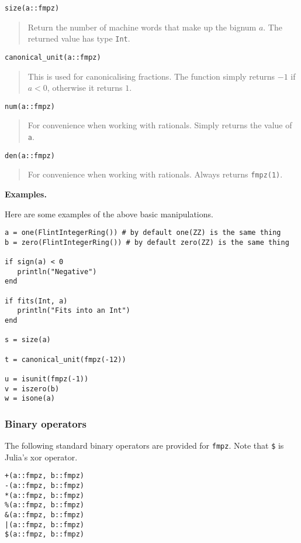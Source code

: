 \documentclass[a4paper,10pt]{article}
\newcommand{\code}{\lstinline}
\newcommand{\desc}[1]{\vspace{-3mm}\begin{quote}#1\end{quote}}
\begin{document}
\begin{lstlisting}
size(a::fmpz)
\end{lstlisting}

\desc{Return the number of machine words that make up the bignum $a$. The
returned value has type \code{Int}.}

\begin{lstlisting}
canonical_unit(a::fmpz)
\end{lstlisting}

\desc{This is used for canonicalising fractions. The function simply returns $-1$
if $a < 0$, otherwise it returns $1$.}

\begin{lstlisting}
num(a::fmpz)
\end{lstlisting}

\desc{For convenience when working with rationals. Simply returns the value of \code{a}.}

\begin{lstlisting}
den(a::fmpz)
\end{lstlisting}

\desc{For convenience when working with rationals. Always returns \code{fmpz(1)}.}

\textbf{Examples.}

Here are some examples of the above basic manipulations.

\begin{lstlisting}
a = one(FlintIntegerRing()) # by default one(ZZ) is the same thing 
b = zero(FlintIntegerRing()) # by default zero(ZZ) is the same thing 

if sign(a) < 0
   println("Negative")
end

if fits(Int, a)
   println("Fits into an Int")
end

s = size(a)

t = canonical_unit(fmpz(-12))

u = isunit(fmpz(-1))
v = iszero(b)
w = isone(a)
\end{lstlisting}

\subsubsection{Binary operators}

The following standard binary operators are provided for \code{fmpz}. Note that \code{$} is Julia's
xor operator.

\begin{lstlisting}
+(a::fmpz, b::fmpz)
-(a::fmpz, b::fmpz)
*(a::fmpz, b::fmpz)
%(a::fmpz, b::fmpz)
&(a::fmpz, b::fmpz)
|(a::fmpz, b::fmpz)
$(a::fmpz, b::fmpz)
\end{lstlisting}
\end{document}
